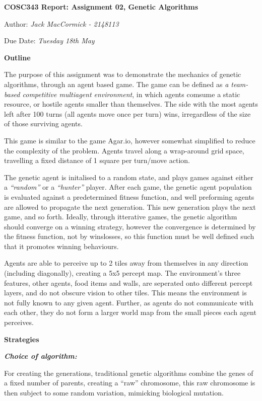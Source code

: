 \documentclass[
]{article}
\author{}
\date{\vspace{-2.5em}}
\begin{document}
\textbf{COSC343 Report: Assignment 02, Genetic Algorithms}

Author: \emph{Jack MacCormick - 2148113}

Due Date: \emph{Tuesday 18th May}

\textbf{Outline}

The purpose of this assignment was to demonstrate the mechanics of
genetic algorithms, through an agent based game. The game can be defined
as \emph{a team-based competitive multiagent environment}, in which
agents comsume a static resource, or hostile agents smaller than
themselves. The side with the most agents left after 100 turns (all
agents move once per turn) wins, irregardless of the size of those
surviving agents.

This game is similar to the game Agar.io, however somewhat simplified to
reduce the complexity of the problem. Agents travel along a wrap-around
grid space, travelling a fixed distance of 1 square per turn/move
action.

The genetic agent is initalised to a random state, and plays games
against either a \emph{``random''} or a \emph{``hunter''} player. After
each game, the genetic agent population is evaluated against a
predetermined fitness function, and well preforming agents are allowed
to propagate the next generation. This new generation plays the next
game, and so forth. Ideally, through itterative games, the genetic
algorithm should converge on a winning strategy, however the convergence
is determined by the fitness function, not by
wins\textbar\textbar losses, so this function must be well defined such
that it promotes winning behaviours.

Agents are able to perceive up to 2 tiles away from themselves in any
direction (including diagonally), creating a 5x5 percept map. The
environment's three features, other agents, food items and walls, are
seperated onto different percept layers, and do not obscure vision to
other tiles. This means the environment is not fully known to any given
agent. Further, as agents do not communicate with each other, they do
not form a larger world map from the small pieces each agent perceives.

\textbf{Strategies}

\textbf{\emph{Choice of algorithm:}}

For creating the generations, traditional genetic algorithms combine the
genes of a fixed number of parents, creating a ``raw'' chromosome, this
raw chromosome is then subject to some random variation, mimicking
biological mutation.
\end{document}

